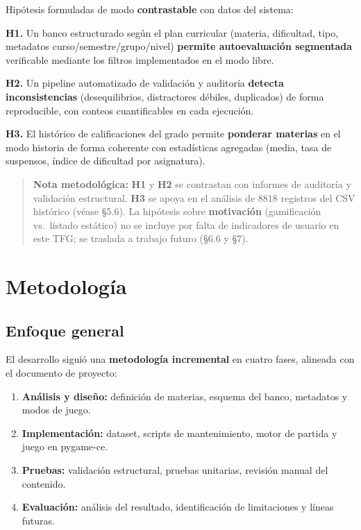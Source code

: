 \documentclass[11pt,a4paper]{article}
\begin{document}
Hipótesis formuladas de modo \textbf{contrastable} con datos del sistema:

\textbf{H1.} Un banco estructurado según el plan curricular (materia, dificultad, tipo, metadatos curso/semestre/grupo/nivel) \textbf{permite autoevaluación segmentada} verificable mediante los filtros implementados en el modo libre.

\textbf{H2.} Un pipeline automatizado de validación y auditoría \textbf{detecta inconsistencias} (desequilibrios, distractores débiles, duplicados) de forma reproducible, con conteos cuantificables en cada ejecución.

\textbf{H3.} El histórico de calificaciones del grado permite \textbf{ponderar materias} en el modo historia de forma coherente con estadísticas agregadas (media, tasa de suspensos, índice de dificultad por asignatura).

\begin{quote}
\textbf{Nota metodológica:} \textbf{H1} y \textbf{H2} se contrastan con informes de auditoría y validación estructural. \textbf{H3} se apoya en el análisis de 8818 registros del CSV histórico (véase §5.6). La hipótesis sobre \textbf{motivación} (gamificación vs.\ listado estático) no se incluye por falta de indicadores de usuario en este TFG; se traslada a trabajo futuro (§6.6 y §7).
\end{quote}

\section{Metodología}

\subsection{Enfoque general}

El desarrollo siguió una \textbf{metodología incremental} en cuatro fases, alineada con el documento de proyecto:
\begin{enumerate}
  \item \textbf{Análisis y diseño:} definición de materias, esquema del banco, metadatos y modos de juego.
  \item \textbf{Implementación:} dataset, scripts de mantenimiento, motor de partida y juego en pygame-ce.
  \item \textbf{Pruebas:} validación estructural, pruebas unitarias, revisión manual del contenido.
  \item \textbf{Evaluación:} análisis del resultado, identificación de limitaciones y líneas futuras.
\end{enumerate}
\end{document}
